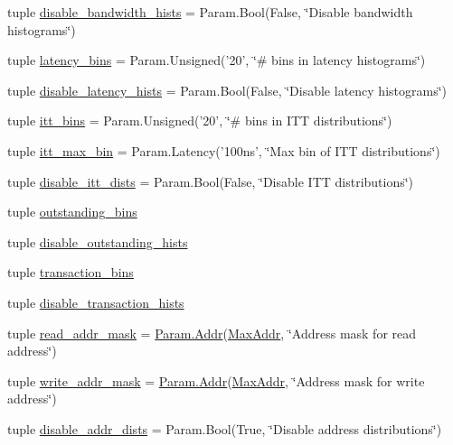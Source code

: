 \begin{DoxyCompactItemize}
\item 
tuple \hyperlink{classCommMonitor_1_1CommMonitor_a0f374644d3dd8b1fc3f15eb3d0601e75}{disable\_\-bandwidth\_\-hists} = Param.Bool(False, \char`\"{}Disable bandwidth histograms\char`\"{})
\item 
tuple \hyperlink{classCommMonitor_1_1CommMonitor_a0df1cda9949a4cbc6472366246639749}{latency\_\-bins} = Param.Unsigned('20', \char`\"{}\# bins in latency histograms\char`\"{})
\item 
tuple \hyperlink{classCommMonitor_1_1CommMonitor_a940041883f4c619b92e2dab3feac5952}{disable\_\-latency\_\-hists} = Param.Bool(False, \char`\"{}Disable latency histograms\char`\"{})
\item 
tuple \hyperlink{classCommMonitor_1_1CommMonitor_ae3eca87109bcaeefbcf6fc6558705a41}{itt\_\-bins} = Param.Unsigned('20', \char`\"{}\# bins in ITT distributions\char`\"{})
\item 
tuple \hyperlink{classCommMonitor_1_1CommMonitor_ae0265480aa96ef4e3edc740566688949}{itt\_\-max\_\-bin} = Param.Latency('100ns', \char`\"{}Max bin of ITT distributions\char`\"{})
\item 
tuple \hyperlink{classCommMonitor_1_1CommMonitor_a97029e2c702b1aee04a803c6ec896d43}{disable\_\-itt\_\-dists} = Param.Bool(False, \char`\"{}Disable ITT distributions\char`\"{})
\item 
tuple \hyperlink{classCommMonitor_1_1CommMonitor_ad48d32bcbd578b8d098a57f9decf1099}{outstanding\_\-bins}
\item 
tuple \hyperlink{classCommMonitor_1_1CommMonitor_a1d030c4765b3eea029b7e3666483c9d2}{disable\_\-outstanding\_\-hists}
\item 
tuple \hyperlink{classCommMonitor_1_1CommMonitor_a9f76969c0df4ff31c4fc2b7c58ef948c}{transaction\_\-bins}
\item 
tuple \hyperlink{classCommMonitor_1_1CommMonitor_a80bdf2f408cb1418639e663a9325ac7a}{disable\_\-transaction\_\-hists}
\item 
tuple \hyperlink{classCommMonitor_1_1CommMonitor_a78f646c812ce581f8c32edb437811a28}{read\_\-addr\_\-mask} = \hyperlink{base_2types_8hh_af1bb03d6a4ee096394a6749f0a169232}{Param.Addr}(\hyperlink{base_2types_8hh_a65da65e69ea5fb1119733a22d695b6f9}{MaxAddr}, \char`\"{}Address mask for read address\char`\"{})
\item 
tuple \hyperlink{classCommMonitor_1_1CommMonitor_a802ec9e3dd95bdcd492a181db99481d8}{write\_\-addr\_\-mask} = \hyperlink{base_2types_8hh_af1bb03d6a4ee096394a6749f0a169232}{Param.Addr}(\hyperlink{base_2types_8hh_a65da65e69ea5fb1119733a22d695b6f9}{MaxAddr}, \char`\"{}Address mask for write address\char`\"{})
\item 
tuple \hyperlink{classCommMonitor_1_1CommMonitor_aa2592e96f141d2bc3faf83dc31516d76}{disable\_\-addr\_\-dists} = Param.Bool(True, \char`\"{}Disable address distributions\char`\"{})
\end{DoxyCompactItemize}



